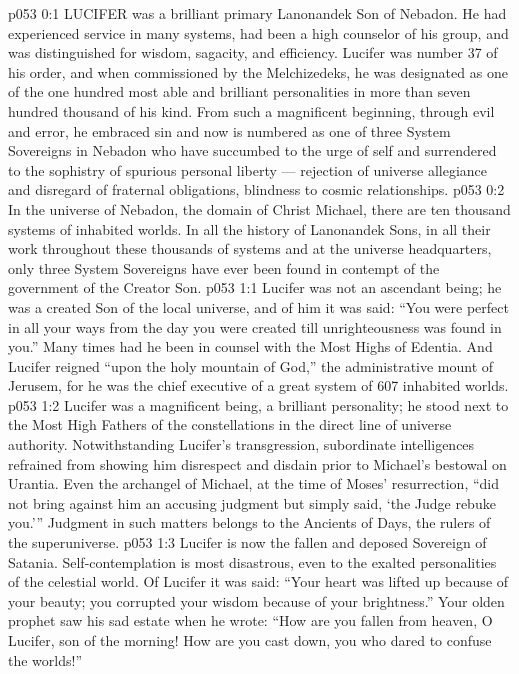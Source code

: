 \vs p053 0:1 LUCIFER was a brilliant primary Lanonandek Son of Nebadon. He had experienced service in many systems, had been a high counselor of his group, and was distinguished for wisdom, sagacity, and efficiency. Lucifer was number 37 of his order, and when commissioned by the Melchizedeks, he was designated as one of the one hundred most able and brilliant personalities in more than seven hundred thousand of his kind. From such a magnificent beginning, through evil and error, he embraced sin and now is numbered as one of three System Sovereigns in Nebadon who have succumbed to the urge of self and surrendered to the sophistry of spurious personal liberty --- rejection of universe allegiance and disregard of fraternal obligations, blindness to cosmic relationships.
\vs p053 0:2 In the universe of Nebadon, the domain of Christ Michael, there are ten thousand systems of inhabited worlds. In all the history of Lanonandek Sons, in all their work throughout these thousands of systems and at the universe headquarters, only three System Sovereigns have ever been found in contempt of the government of the Creator Son.
\vs p053 1:1 Lucifer was not an ascendant being; he was a created Son of the local universe, and of him it was said: “You were perfect in all your ways from the day you were created till unrighteousness was found in you.” Many times had he been in counsel with the Most Highs of Edentia. And Lucifer reigned “upon the holy mountain of God,” the administrative mount of Jerusem, for he was the chief executive of a great system of 607 inhabited worlds.
\vs p053 1:2 Lucifer was a magnificent being, a brilliant personality; he stood next to the Most High Fathers of the constellations in the direct line of universe authority. Notwithstanding Lucifer’s transgression, subordinate intelligences refrained from showing him disrespect and disdain prior to Michael’s bestowal on Urantia. Even the archangel of Michael, at the time of Moses’ resurrection, “did not bring against him an accusing judgment but simply said, ‘the Judge rebuke you.’” Judgment in such matters belongs to the Ancients of Days, the rulers of the superuniverse.
\vs p053 1:3 Lucifer is now the fallen and deposed Sovereign of Satania. Self\hyp{}contemplation is most disastrous, even to the exalted personalities of the celestial world. Of Lucifer it was said: “Your heart was lifted up because of your beauty; you corrupted your wisdom because of your brightness.” Your olden prophet saw his sad estate when he wrote: “How are you fallen from heaven, O Lucifer, son of the morning! How are you cast down, you who dared to confuse the worlds!”
